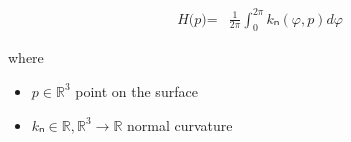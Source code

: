 \documentclass[12pt]{article}
\begin{document}
\begin{align*}
\textit{H(p)} = & \frac{1}{2\pi}\int_{0}^{2\pi} \textit{kₙ}\left( \textit{φ},\textit{p} \right) d\textit{φ}
\end{align*}

where
\begin{itemize}
\item $\textit{p} \in \mathbb{R}^{ 3}$ point on the surface
\item $\textit{kₙ} \in \mathbb{{R}},\mathbb{R}^{ 3}\rightarrow \mathbb{{R}}$ normal curvature
\end{itemize}
\end{document}
